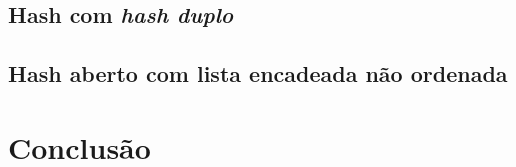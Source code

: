 \documentclass{article}
\begin{document}
\subsection{Hash com \textit{hash duplo}}
%
%
%
\subsection{Hash aberto com lista encadeada não ordenada}
%
%
%
\begin{comment}
\begin{table}
    \begin{tabular}{c|c|c|c|c|c}
        n = & $10^{1}$ & $10^{2}$ & $10^{3}$ & $10^{4}$ & $10^{5}$ \\ 
        \hline
        Vetor aleatório & $5\cdot 10^{-6}$ & $4.9\cdot 10^{-5}$ & $3.3\cdot 10^{-4}$ & $3.81\cdot 10^{-3}$ & $4.49\cdot 10^{-2}$ \\
        \hline
        Vetor crescente & $2.0\cdot10^{-6}$ & $1.5\cdot 10^{-5}$ & $2.56\cdot 10^{-4}$ & $3.39\cdot 10^{-3}$ & $3.93\cdot 10^{-2}$\\
        \hline
        Vetor decrescente & $2\cdot10^{-6}$ & $1.6\cdot 10^{-5}$ & $2.52\cdot 10^{-4}$ & $3.25\cdot 10^{-3}$ & $3.77\cdot 10^{-2}$\\
        \hline
        Média & $3\cdot 10^{-6}$ & $2.67\cdot 10^{-5}$ & $2.79\cdot10^{-4}$ & $3.48\cdot 10^{-3}$ & $4.19\cdot 10^{-2}$ \\
        \hline
        Desvio Padrão & $1.41\cdot 10^{-6}$ & $1.58\cdot 10^{-5}$ & $3.59\cdot 10^{-5}$ & $2.42\cdot 10^{-4}$ & $4.88\cdot 10^{-3}$ \\
    \end{tabular}
    \caption{Medidas de tempo para o RadixSort em segundos}
\end{table}\par
\end{comment}
\section{Conclusão}
%
%
%
\end{document}
